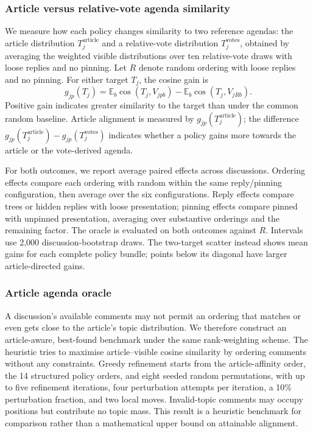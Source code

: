 \subsubsection{Article versus relative-vote agenda similarity}
We measure how each policy changes similarity to two reference agendas: the article distribution $T_j^{\mathrm{article}}$ and a relative-vote distribution $T_j^{\mathrm{votes}}$, obtained by averaging the weighted visible distributions over ten relative-vote draws with loose replies and no pinning. Let $R$ denote random ordering with loose replies and no pinning. For either target $T_j$, the cosine gain is
\begin{equation}
g_{jp}(T_j)=\mathbb{E}_b\cos(T_j,V_{jpb})-
\mathbb{E}_b\cos(T_j,V_{jRb}).
\end{equation}
Positive gain indicates greater similarity to the target than under the common random baseline. Article alignment is measured by $g_{jp}(T_j^{\mathrm{article}})$; the difference $g_{jp}(T_j^{\mathrm{article}})-g_{jp}(T_j^{\mathrm{votes}})$ indicates whether a policy gains more towards the article or the vote-derived agenda.

For both outcomes, we report average paired effects across discussions. Ordering effects compare each ordering with random within the same reply/pinning configuration, then average over the six configurations. Reply effects compare trees or hidden replies with loose presentation; pinning effects compare pinned with unpinned presentation, averaging over substantive orderings and the remaining factor. The oracle is evaluated on both outcomes against $R$. Intervals use 2,000 discussion-bootstrap draws. The two-target scatter instead shows mean gains for each complete policy bundle; points below its diagonal have larger article-directed gains.

\subsubsection{Article agenda oracle}

A discussion's available comments may not permit an ordering that matches or even gets close to the article's topic distribution. We therefore construct an article-aware, best-found benchmark under the same rank-weighting scheme. The heuristic tries to maximise article--visible cosine similarity by ordering comments without any constraints. Greedy refinement starts from the article-affinity order, the 14 structured policy orders, and eight seeded random permutations, with up to five refinement iterations, four perturbation attempts per iteration, a 10\% perturbation fraction, and two local moves. Invalid-topic comments may occupy positions but contribute no topic mass. This result is a heuristic benchmark for comparison rather than a mathematical upper bound on attainable alignment.

